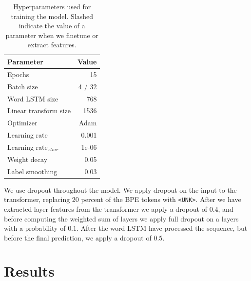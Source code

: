 \documentclass[11pt]{article}
\begin{document}
	\begin{table}%
		\centering
		\begin{tabular}{lr} \\
			Parameter & Value \\
			\hline
			Epochs & 15 \\
			Batch size & 4 / 32 \\
            Word LSTM size & 768 \\
            Linear transform size & 1536 \\
			Optimizer & Adam \\
			Learning rate & 0.001 \\
			Learning rate$_{xlmr}$ & 1e-06 \\
            Weight decay & 0.05 \\
			Label smoothing & 0.03 \\
		\end{tabular}
    		\caption{\label{tab:parameters} Hyperparameters used for
     training the model. Slashed indicate the value of a parameter
     when we finetune or extract features.}
	\end{table}

        We use dropout throughout the model. We apply dropout on the
        input to the transformer, replacing 20 percent of the BPE tokens
        with \texttt{<UNK>}. After we have extracted layer features
        from the transformer we apply a dropout of $0.4$, and before
        computing the weighted sum of layers we apply full dropout on
        a layers with a probability of $0.1$. After the word LSTM have
        processed the sequence, but before the final prediction, we
        apply a dropout of $0.5$.

	
	\section{Results}
	\label{results}
\end{document}

